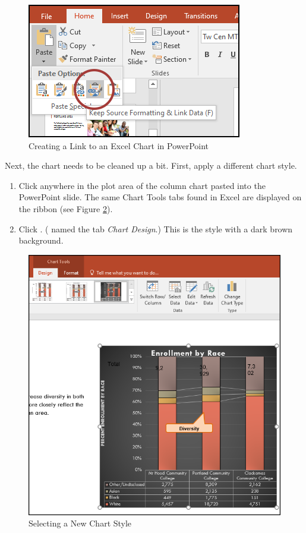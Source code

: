 \begin{figure}[H]
	\centering
	\includegraphics[width=\maxwidth{.75\linewidth}]{gfx/ch04_fig49}
	\caption{Creating a Link to an Excel Chart in PowerPoint}
	\label{04:fig49}
\end{figure}

Next, the chart needs to be cleaned up a bit. First, apply a different chart style.

\begin{enumerate}
	\item Click anywhere in the plot area of the column chart pasted into the PowerPoint slide. The same Chart Tools tabs found in Excel are displayed on the ribbon (see Figure \ref{04:fig50}).
	\item Click . ( named the tab \textit{Chart Design}.) This is the style with a dark brown background.
\end{enumerate}

\begin{figure}[H]
	\centering
	\includegraphics[width=\maxwidth{.85\linewidth}]{gfx/ch04_fig50}
	\caption{Selecting a New Chart Style}
	\label{04:fig50}
\end{figure}

